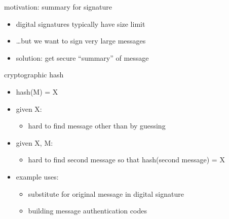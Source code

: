 \begin{frame}{motivation: summary for signature}
    \begin{itemize}
    \item digital signatures typically have size limit
    \item \ldots but we want to sign very large messages
    \vspace{.5cm}
    \item solution: get secure ``summary'' of message
    \end{itemize}
\end{frame}

\begin{frame}{cryptographic hash}
    \begin{itemize}
    \item hash(M) = X
    \vspace{.5cm}
    \item given X:
        \begin{itemize}
        \item hard to find message other than by guessing
        \end{itemize}
    \item given X, M:
        \begin{itemize}
        \item hard to find second message so that hash(second message) = X
        \end{itemize}
    \vspace{.5cm}
    \item example uses:
        \begin{itemize}
        \item substitute for original message in digital signature
        \item building message authentication codes
        \end{itemize}
    \end{itemize}
\end{frame}


